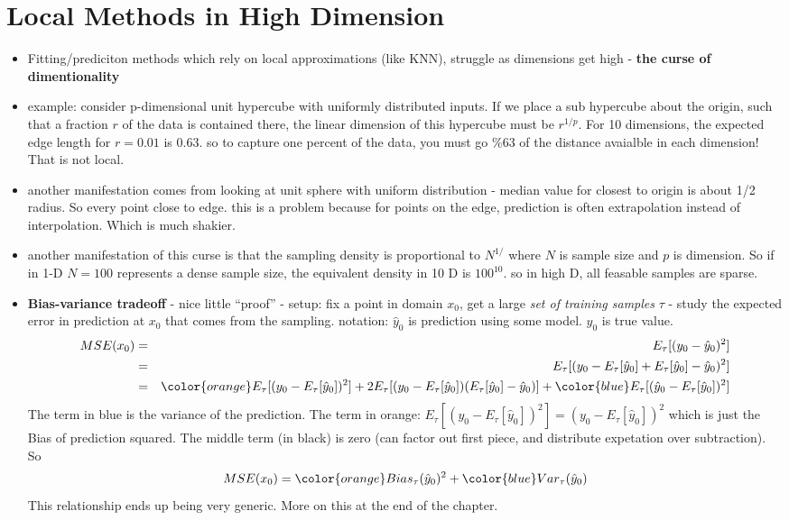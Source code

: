 \section{Local Methods in High Dimension}
\begin{itemize}
  \item Fitting/prediciton methods which rely on local approximations (like KNN), struggle as dimensions get high - {\bf the curse of dimentionality}
  \item example: consider p-dimensional unit hypercube with uniformly distributed inputs. If we place a sub hypercube about the origin, such that a fraction $r$ of the data is contained there,
    the linear dimension of this hypercube must be $r^{1/p}$. For 10 dimensions, the expected edge length for $r=0.01$ is $0.63$.
    \subitem so to capture one percent of the data, you must go $\%63$ of the distance avaialble in each dimension! That is not local.
  \item another manifestation comes from looking at unit sphere with uniform distribution - median value for closest to origin is about 1/2 radius. So every point close to edge.
    \subitem this is a problem because for points on the edge, prediction is often extrapolation instead of interpolation. Which is much shakier.
  \item another manifestation of this curse is that the sampling density is proportional to $N^{1/}$ where $N$ is sample size and $p$ is dimension. So if in 1-D $N=100$ represents a dense sample size, the equivalent density in 10 D is $100^{10}$. 
    \subitem so in high D, all feasable samples are sparse.
  \item {\bf Bias-variance tradeoff} - nice little ``proof'' - setup: fix a point in domain $x_0$, get a large \emph{set of training samples} $\tau$ - study the expected error in prediction at $x_0$ that comes from the sampling.
    \subitem notation: $\hat{y}_0$ is prediction using some model. $y_0$ is true value.
    \begin{eqnarray}
      MSE(x_0) &=& E_\tau[(y_0 - \hat{y}_0)^2]\\
      	&=& E_\tau[(y_0 - E_\tau[\hat{y}_0] + E_\tau[\hat{y}_0] - \hat{y}_0)^2 ] \\
	&=& {\color{orange} E_\tau[(y_0 - E_\tau[\hat{y}_0])^2]} + 2E_\tau[(y_0 - E_\tau[\hat{y}_0])(E_\tau[\hat{y}_0] - \hat{y}_0)] +   {\color{blue} E_\tau[(\hat{y}_0 - E_\tau[\hat{y}_0])^2] }
      \end{eqnarray}
      The term in blue is the variance of the prediction.
      The term in orange: $E_\tau[(y_0 - E_\tau[\hat{y}_0])^2] = (y_0 - E_\tau[\hat{y}_0])^2$ which is just the Bias of prediction squared.
      The middle term (in black) is zero (can factor out first piece, and distribute expetation over subtraction). So
      \begin{equation}
      MSE(x_0) =  {\color{orange} Bias_\tau(\hat{y}_0)^2} + {\color{blue} Var_\tau(\hat{y}_0)}
    	\end{equation}
	This relationship ends up being very generic. More on this at the end of the chapter.
\end{itemize}


